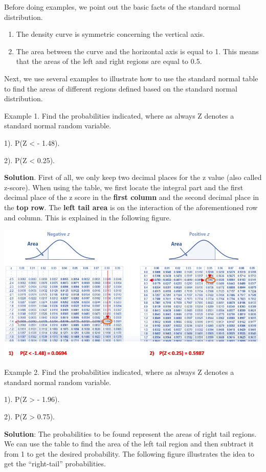 \documentclass[
]{book}
\begin{document}
Before doing examples, we point out the basic facts of the standard normal distribution.

\begin{enumerate}
\def\labelenumi{\arabic{enumi}.}
\item
  The density curve is symmetric concerning the vertical axis.
\item
  The area between the curve and the horizontal axis is equal to 1. This means that the areas of the left and right regions are equal to 0.5.
\end{enumerate}

Next, we use several examples to illustrate how to use the standard normal table to find the areas of different regions defined based on the standard normal distribution.

Example 1. Find the probabilities indicated, where as always Z denotes a standard normal random variable.

1). P(Z \textless{} - 1.48).

2). P(Z \textless{} 0.25).

\textbf{Solution}. First of all, we only keep two decimal places for the z value (also called z-score). When using the table, we first locate the integral part and the first decimal place of the z score in the \textbf{first column} and the second decimal place in the \textbf{top row}. The \textbf{left tail area} is on the interaction of the aforementioned row and column. This is explained in the following figure.

\begin{center}\includegraphics[width=0.6\linewidth]{week04/example01} \end{center}

Example 2. Find the probabilities indicated, where as always Z denotes a standard normal random variable.

1). P(Z \textgreater{} - 1.96).

2). P(Z \textgreater{} 0.75).

\textbf{Solution}: The probabilities to be found represent the areas of right tail regions. We can use the table to find the area of the left tail region and then subtract it from 1 to get the desired probability. The following figure illustrates the idea to get the ``right-tail'' probabilities.
\end{document}
